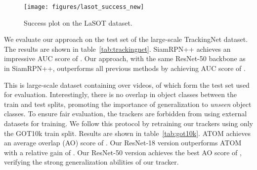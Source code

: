 \documentclass[10pt,twocolumn,letterpaper]{article}
\begin{document}
\begin{figure}[t]
	\centering \newcommand{\wid}{0.55\columnwidth}\texttt{[image: figures/lasot\_success\_new]}\vspace{-1.5mm}\caption{Success plot on the LaSOT dataset.}\label{fig:lasot}\vspace{-4mm}\end{figure}

 We evaluate our approach on the test set of the large-scale TrackingNet dataset. The results are shown in table~\ref{tab:trackingnet}. SiamRPN++ achieves an impressive AUC score of . Our approach, with the same ResNet-50 backbone as in SiamRPN++, outperforms all previous methods by achieving AUC score of .

 This is large-scale dataset containing over  videos,  of which form the test set used for evaluation. Interestingly, there is no overlap in object classes between the train and test splits, promoting the importance of generalization to \emph{unseen} object classes. To ensure fair evaluation, the trackers are forbidden from using external datasets for training. We follow this protocol by retraining our trackers using only the GOT10k train split. Results are shown in table~\ref{tab:got10k}. ATOM achieves an average overlap (AO) score of . Our ResNet-18 version outperforms ATOM with a relative gain of . 
Our ResNet-50 version achieves the best AO score of , verifying the strong generalization abilities of our tracker.
\end{document}
